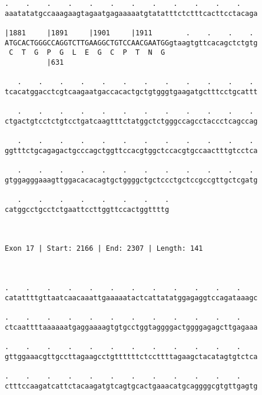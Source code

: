 \documentclass{article}
\begin{document}
\begin{Verbatim}
.    .    .    .    .    .    .    .    .    .    .    .    
aaatatatgccaaagaagtagaatgagaaaaatgtatatttctctttcacttcctacaga
                                                            
|1881     |1891     |1901     |1911        .    .    .    . 
ATGCACTGGGCCAGGTCTTGAAGGCTGTCCAACGAATGGgtaagtgttcacagctctgtg
 C  T  G  P  G  L  E  G  C  P  T  N  G                      
          |631                                              
  
   .    .    .    .    .    .    .    .    .    .    .    . 
tcacatggacctcgtcaagaatgaccacactgctgtgggtgaagatgctttcctgcattt
                                                            
   .    .    .    .    .    .    .    .    .    .    .    . 
ctgactgtcctctgtcctgatcaagtttctatggctctgggccagcctaccctcagccag
                                                            
   .    .    .    .    .    .    .    .    .    .    .    . 
ggtttctgcagagactgcccagctggttccacgtggctccacgtgccaactttgtcctca
                                                            
   .    .    .    .    .    .    .    .    .    .    .    . 
gtggagggaaagttggacacacagtgctggggctgctccctgctccgccgttgctcgatg
                                                            
   .    .    .    .    .    .    .    .
catggcctgcctctgaattccttggttccactggttttg
                                       
                                       
 
Exon 17 | Start: 2166 | End: 2307 | Length: 141



.    .    .    .    .    .    .    .    .    .    .    .    
catattttgttaatcaacaaattgaaaaatactcattatatggagaggtccagataaagc
                                                            
.    .    .    .    .    .    .    .    .    .    .    .    
ctcaattttaaaaaatgaggaaaagtgtgcctggtaggggactggggagagcttgagaaa
                                                            
.    .    .    .    .    .    .    .    .    .    .    .    
gttggaaacgttgccttagaagcctgttttttctccttttagaagctacatagtgtctca
                                                            
.    .    .    .    .    .    .    .    .    .    .    .    
ctttccaagatcattctacaagatgtcagtgcactgaaacatgcaggggcgtgttgagtg
                                                            

\end{Verbatim}
\end{document}
